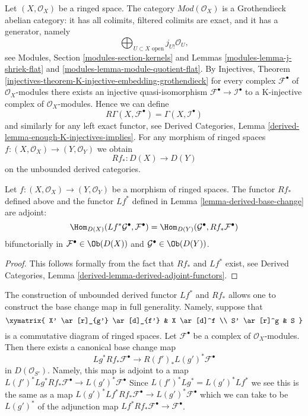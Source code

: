 \noindent
Let $(X, \mathcal{O}_X)$ be a ringed space.
The category $\textit{Mod}(\mathcal{O}_X)$ is a Grothendieck
abelian category: it has all colimits,
filtered colimits are exact, and it has a generator, namely
$$
\bigoplus\nolimits_{U \subset X\text{ open}} j_{U!}\mathcal{O}_U,
$$
see Modules, Section \ref{modules-section-kernels} and
Lemmas \ref{modules-lemma-j-shriek-flat} and
\ref{modules-lemma-module-quotient-flat}.
By
Injectives, Theorem
\ref{injectives-theorem-K-injective-embedding-grothendieck}
for every complex $\mathcal{F}^\bullet$ of $\mathcal{O}_X$-modules
there exists an injective quasi-isomorphism
$\mathcal{F}^\bullet \to \mathcal{I}^\bullet$ to a K-injective complex
of $\mathcal{O}_X$-modules. Hence we can define
$$
R\Gamma(X, \mathcal{F}^\bullet) = \Gamma(X, \mathcal{I}^\bullet)
$$
and similarly for any left exact functor, see
Derived Categories, Lemma \ref{derived-lemma-enough-K-injectives-implies}.
For any morphism of
ringed spaces $f : (X, \mathcal{O}_X) \to (Y, \mathcal{O}_Y)$ we obtain
$$
Rf_* : D(X) \longrightarrow D(Y)
$$
on the unbounded derived categories.

\begin{lemma}
\label{lemma-adjoint}
Let $f : (X, \mathcal{O}_X) \to (Y, \mathcal{O}_Y)$ be a morphism of
ringed spaces. The functor $Rf_*$ defined above and the functor $Lf^*$
defined in Lemma \ref{lemma-derived-base-change} are adjoint:
$$
\Hom_{D(X)}(Lf^*\mathcal{G}^\bullet, \mathcal{F}^\bullet)
=
\Hom_{D(Y)}(\mathcal{G}^\bullet, Rf_*\mathcal{F}^\bullet)
$$
bifunctorially in $\mathcal{F}^\bullet \in \Ob(D(X))$ and
$\mathcal{G}^\bullet \in \Ob(D(Y))$.
\end{lemma}

\begin{proof}
This follows formally from the fact that $Rf_*$ and $Lf^*$ exist, see
Derived Categories, Lemma \ref{derived-lemma-derived-adjoint-functors}.
\end{proof}

\begin{remark}
\label{remark-base-change}
The construction of unbounded derived functor $Lf^*$ and $Rf_*$
allows one to construct the base change map in full generality.
Namely, suppose that
$$
\xymatrix{
X' \ar[r]_{g'} \ar[d]_{f'} &
X \ar[d]^f \\
S' \ar[r]^g &
S
}
$$
is a commutative diagram of ringed spaces. Let $\mathcal{F}^\bullet$ be a
complex of $\mathcal{O}_X$-modules. Then there exists a canonical base change
map
$$
Lg^*Rf_*\mathcal{F}^\bullet
\longrightarrow
R(f')_*L(g')^*\mathcal{F}^\bullet
$$
in $D(\mathcal{O}_{S'})$. Namely, this map is adjoint to a map
$
L(f')^*Lg^*Rf_*\mathcal{F}^\bullet
\to
L(g')^*\mathcal{F}^\bullet
$
Since $L(f')^*Lg^* = L(g')^*Lf^*$ we see this is the same as a map
$
L(g')^*Lf^*Rf_*\mathcal{F}^\bullet
\to
L(g')^*\mathcal{F}^\bullet
$
which we can take to be $L(g')^*$ of the adjunction map
$Lf^*Rf_*\mathcal{F}^\bullet \to \mathcal{F}^\bullet$.
\end{remark}

